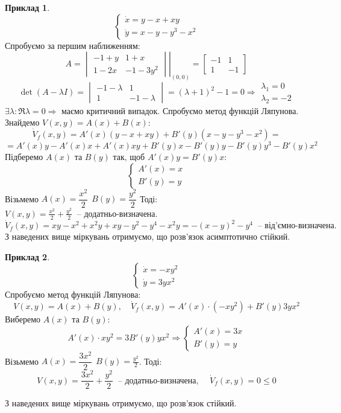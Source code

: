 \documentclass[14pt,a4paper]{scrartcl}
\theoremstyle{definition}
\newtheorem*{example}{Приклад}
\theoremstyle{definition}
\theoremstyle{definition}
\begin{document}
\begin{example}
 $$
 \begin{cases}
\dot{x} = y-x+xy\\
\dot{y} = x-y-y^3 -x^2
 \end{cases}
 $$
 Спробуємо за першим наближенням:
 $$
 A = \left. \begin{vmatrix}
  -1+y & 1 + x \\
  1 - 2x & -1-3y^2
 \end{vmatrix} \right|_{(0,0)} = \begin{bmatrix}
  -1 & 1 \\
  1 & -1
 \end{bmatrix}
 $$
 $$
 \det(A - \lambda I) = \begin{vmatrix}
   -1 - \lambda & 1 \\
   1 & -1-\lambda
 \end{vmatrix} = (\lambda + 1)^2  - 1 = 0 \Rightarrow \begin{gathered}
  \lambda_1 = 0 \\
  \lambda_2 = -2
 \end{gathered}
 $$
 $\exists \lambda : \Re \lambda = 0 \Longrightarrow $ маємо критичний випадок. Спробуємо метод функцій Ляпунова. Знайдемо $V(x,y) = A(x) + B(x)$:
$$
\dot{V}_f (x,y) = A'(x)(y-x+xy) + B'(y) (x-y-y^3 -x^2) =
$$
$$
= A'(x)y - A'(x)x + A'(x)xy + B'(y)x - B'(y)y - B'(y)y^3 - B'(y)x^2
$$
Підберемо $A(x)$ та $B(y)$ так, щоб $
A'(x)y = B'(y)x
$:
$$
\begin{cases}
 A'(x)  = x\\
 B'(y) = y
\end{cases}
$$
Візьмемо $A(x) = \dfrac{x^2}{2}\ \  B(y) = \dfrac{y^2}{2} $ Тоді: $V(x,y) = \frac{x^2}{2} + \frac{y^2}{2} \ \text{ -- додатньо-визначена.}$ $$\dot{V}_f (x,y) = xy - x^2 + x^2 y  + xy - y^2 - y^4 - x^2 y = -(x-y)^2 - y^4 \ \text{ -- від'ємно-визначена.} $$
З наведених вище міркувань отримуємо, що розв'язок асимптотично стійкий.
\end{example}

\begin{example}
 $$
 \begin{cases}
  \dot{x } = -xy^2\\
  \dot{y} = 3yx^2
 \end{cases}
 $$
 Спробуємо метод функцій Ляпунова:
 $$
 V(x,y) = A(x) + B(y), \quad
 \dot{V}_f (x,y) = A'(x) \cdot (-xy^2) + B'(y) 3yx^2
 $$
 Виберемо $A(x)$ та $B(y)$:
 $$
 A'(x) \cdot xy^2 = 3 B'(y) yx^2 \Longrightarrow \begin{cases}
  A'(x)  = 3x\\
  B'(y) = y
 \end{cases}
 $$
Візьмемо $A(x) = \dfrac{3x^2}{2} \ \  B(y) = \frac{y^2}{2} $. Тоді:
$$ V(x,y) = \frac{3x^2}{2} + \frac{y^2}{2}  \ \text{ -- додатньо-визначена, } \quad \dot{V}_f (x,y) = 0 \leq 0$$
\end{example}
З наведених вище міркувань отримуємо, що розв'язок стійкий.
\end{document}
